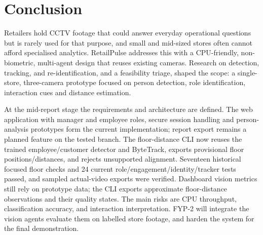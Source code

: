 \chapter{Conclusion}
Retailers hold CCTV footage that could answer everyday operational questions but is rarely used for that purpose, and small and mid-sized stores often cannot afford specialised analytics. RetailPulse addresses this with a CPU-friendly, non-biometric, multi-agent design that reuses existing cameras. Research on detection, tracking, and re-identification, and a feasibility triage, shaped the scope: a single-store, three-camera prototype focused on person detection, role identification, interaction cues and distance estimation.

At the mid-report stage the requirements and architecture are defined. The web application with manager and employee roles, secure session handling and person-analysis prototypes form the current implementation; report export remains a planned feature on the tested branch. The floor-distance CLI now reuses the trained employee/customer detector and ByteTrack, exports provisional floor positions/distances, and rejects unsupported alignment. Seventeen historical focused floor checks and 24 current role/engagement/identity/tracker tests passed, and sampled actual-video exports were verified. Dashboard vision metrics still rely on prototype data; the CLI exports approximate floor-distance observations and their quality states. The main risks are CPU throughput, classification accuracy, and interaction interpretation. FYP-2 will integrate the vision agents evaluate them on labelled store footage, and harden the system for the final demonstration.
